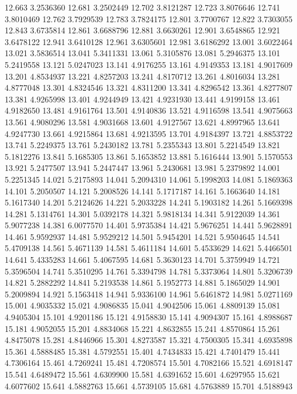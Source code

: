 12.663 3.2536360
12.681 3.2502449
12.702 3.8121287
12.723 3.8076646
12.741 3.8010469
12.762 3.7929539
12.783 3.7824175
12.801 3.7700767
12.822 3.7303055
12.843 3.6735814
12.861 3.6688796
12.881 3.6630261
12.901 3.6548865
12.921 3.6478122
12.941 3.6410128
12.961 3.6305601
12.981 3.6186292
13.001 3.6022464
13.021 3.5836514
13.041 5.3411331
13.061 5.3105876
13.081 5.2946375
13.101 5.2419558
13.121 5.0247023
13.141 4.9176255
13.161 4.9149353
13.181 4.9017609
13.201 4.8534937
13.221 4.8257203
13.241 4.8170712
13.261 4.8016034
13.281 4.8777048
13.301 4.8324546
13.321 4.8311200
13.341 4.8296542
13.361 4.8277807
13.381 4.9265998
13.401 4.9244949
13.421 4.9231930
13.441 4.9199158
13.461 4.9182650
13.481 4.9161764
13.501 4.9140836
13.521 4.9116598
13.541 4.9075663
13.561 4.9080296
13.581 4.9031668
13.601 4.9127567
13.621 4.8997965
13.641 4.9247730
13.661 4.9215864
13.681 4.9213595
13.701 4.9184397
13.721 4.8853722
13.741 5.2249375
13.761 5.2430182
13.781 5.2355343
13.801 5.2214549
13.821 5.1812276
13.841 5.1685305
13.861 5.1653852
13.881 5.1616444
13.901 5.1570553
13.921 5.2477507
13.941 5.2447447
13.961 5.2430681
13.981 5.2379892
14.001 5.2251345
14.021 5.2175893
14.041 5.2094310
14.061 5.1998203
14.081 5.1869363
14.101 5.2050507
14.121 5.2008526
14.141 5.1717187
14.161 5.1663640
14.181 5.1617340
14.201 5.2124626
14.221 5.2033228
14.241 5.1903182
14.261 5.1669398
14.281 5.1314761
14.301 5.0392178
14.321 5.9818134
14.341 5.9122039
14.361 5.9077238
14.381 6.0077570
14.401 5.9735384
14.421 5.9676251
14.441 5.9628891
14.461 5.9592937
14.481 5.9529212
14.501 5.9454201
14.521 5.9504645
14.541 5.4709138
14.561 5.4671139
14.581 5.4611184
14.601 5.4533629
14.621 5.4466501
14.641 5.4335283
14.661 5.4067595
14.681 5.3630123
14.701 5.3759949
14.721 5.3596504
14.741 5.3510295
14.761 5.3394798
14.781 5.3373064
14.801 5.3206739
14.821 5.2882292
14.841 5.2193538
14.861 5.1952773
14.881 5.1865029
14.901 5.2009894
14.921 5.1563418
14.941 5.9336100
14.961 5.6461872
14.981 5.0271169
15.001 4.9035332
15.021 4.9086835
15.041 4.9042506
15.061 4.8809139
15.081 4.9405304
15.101 4.9201186
15.121 4.9158830
15.141 4.9094307
15.161 4.8988687
15.181 4.9052055
15.201 4.8834068
15.221 4.8632855
15.241 4.8570864
15.261 4.8475078
15.281 4.8446966
15.301 4.8273587
15.321 4.7500305
15.341 4.6935898
15.361 4.5888485
15.381 4.5792551
15.401 4.7434833
15.421 4.7401479
15.441 4.7306164
15.461 4.7269241
15.481 4.7208574
15.501 4.7082166
15.521 4.6918147
15.541 4.6489472
15.561 4.6309900
15.581 4.6391652
15.601 4.6297955
15.621 4.6077602
15.641 4.5882763
15.661 4.5739105
15.681 4.5763889
15.701 4.5188943

